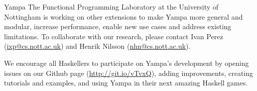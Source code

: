 \begin{hcarentry}[updated]{Yampa}
The Functional Programming Laboratory at the University of Nottingham is
working on other extensions to make Yampa more general and modular, increase
performance, enable new use cases and address existing limitations. To
collaborate with our research, please contact Ivan Perez
(\href{mailto:ixp@cs.nott.ac.uk}{ixp@cs.nott.ac.uk}) and Henrik Nilsson
(\href{mailto:nhn@cs.nott.ac.uk}{nhn@cs.nott.ac.uk}).

We encourage all Haskellers to participate on Yampa's development by opening
issues on our Github page (\href{http://git.io/vTvxQ}{http://git.io/vTvxQ}),
adding improvements, creating tutorials and examples, and using Yampa in their
next amazing Haskell games.


\end{hcarentry}
